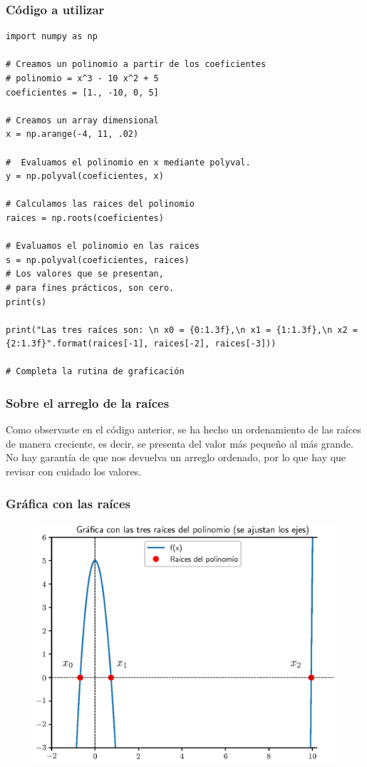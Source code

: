 \documentclass[12pt]{beamer}
\begin{document}
\begin{frame}
\frametitle{Código a utilizar}
\begin{lstlisting}[caption=Código completo para resolver el ejercicio]
import numpy as np

# Creamos un polinomio a partir de los coeficientes
# polinomio = x^3 - 10 x^2 + 5
coeficientes = [1., -10, 0, 5]   

# Creamos un array dimensional
x = np.arange(-4, 11, .02)

#  Evaluamos el polinomio en x mediante polyval.
y = np.polyval(coeficientes, x)

# Calculamos las raices del polinomio
raices = np.roots(coeficientes)

# Evaluamos el polinomio en las raices
s = np.polyval(coeficientes, raices)
# Los valores que se presentan,
# para fines prácticos, son cero.
print(s)

print("Las tres raíces son: \n x0 = {0:1.3f},\n x1 = {1:1.3f},\n x2 = {2:1.3f}".format(raices[-1], raices[-2], raices[-3]))

# Completa la rutina de graficación
\end{lstlisting}
\end{frame}
\begin{frame}
\frametitle{Sobre el arreglo de la raíces}
Como observaste en el código anterior, se ha hecho un ordenamiento de las raíces de manera creciente, es decir, se presenta del valor más pequeño al más grande.
\\
\bigskip
\pause
No hay garantía de que  nos devuelva un arreglo ordenado, por lo que hay que revisar con cuidado los valores.
\end{frame}
\begin{frame}
\frametitle{Gráfica con las raíces}
\begin{figure}
    \centering
    \includegraphics[scale=0.55]{Imagenes/raices_numpy_roots_02.eps}
\end{figure}
\end{frame}
\end{document}
